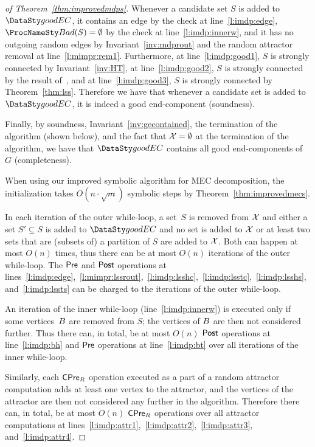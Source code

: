 \begin{proof}[of Theorem~\ref{thm:improvedmdps}]

\smallskip{}
Whenever a candidate set $S$ is added to $\good$, it contains an edge
by the check at line~\ref{l:imdp:edge}, $\bad(S) = \emptyset$ by the check
at line~\ref{l:imdp:innerw}, and it has no outgoing random edges
by Invariant~\ref{inv:mdprout} and the random attractor
removal at line~\ref{l:mimpr:rem1}.
Furthermore,  at line~\ref{l:imdp:good1}, $S$ is strongly connected by Invariant~\ref{inv:HT},
 at line~\ref{l:imdp:good2}, $S$ is strongly connected by the result of~\sccalg, and 
at line~\ref{l:imdp:good3}, $S$ is strongly connected by Theorem~\ref{thm:lss}.
Therefore we have that whenever a candidate set is added to $\good$,
it is indeed a good end-component (soundness).

Finally, by soundness, Invariant~\ref{inv:gecontained}, the termination of the
algorithm (shown below), and the fact that $\mathcal{X} = \emptyset$ at the
termination of the algorithm, we have that $\good$ contains all good
end-components of $G$ (completeness).

\smallskip{}
When using our improved symbolic algorithm for MEC decomposition,
the initialization takes $O(n\cdot \sqrt{m})$ symbolic steps by Theorem~\ref{thm:improvedmecs}.

In each iteration of the outer while-loop, a set~$S$ is removed
from $\mathcal{X}$ and either  a set $S' \subseteq S$ is added
to $\good$ and no set is added to $\mathcal{X}$ or  at least two
sets that are (subsets of) a partition of $S$ are added to $\mathcal{X}$.
Both can happen at most $O(n)$ times, thus there can be at most $O(n)$ iterations
of the outer while-loop. The $\mathsf{Pre}$ and $\mathsf{Post}$ operations at
lines~\ref{l:imdp:edge},~\ref{l:mimpr:lssrout},~\ref{l:imdp:lsshc},~\ref{l:imdp:lsstc},~\ref{l:imdp:lsshs},
and~\ref{l:imdp:lssts} can be charged to the iterations of the outer while-loop.

An iteration of the inner while-loop (line~\ref{l:imdp:innerw}) is executed
only if some vertices~$B$ are removed from $S$; the vertices of $B$
are then not considered further. Thus there can, in total, be at most $O(n)$
$\mathsf{Post}$ operations at line~\ref{l:imdp:bh} and $\mathsf{Pre}$ operations at line~\ref{l:imdp:bt}
over all iterations of the inner while-loop.

Similarly, each $\mathsf{CPre}_{R}$ operation executed as a part of a random attractor computation
adds at least one vertex to the attractor, and the vertices of the attractor are then not
considered any further in the algorithm. Therefore there can, in total, be at most
$O(n)$ $\mathsf{CPre}_{R}$ operations over all attractor computations at
lines~\ref{l:imdp:attr1},~\ref{l:imdp:attr2},~\ref{l:imdp:attr3}, and~\ref{l:imdp:attr4}.
 

\end{proof}
